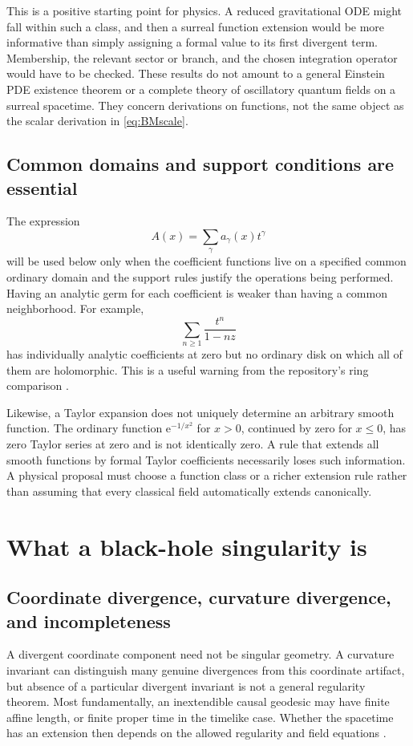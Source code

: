 \documentclass[11pt,a4paper]{article}
\numberwithin{equation}{section}
\theoremstyle{definition}
\theoremstyle{remark}
\newcommand{\ee}{\mathrm e}
\begin{document}
This is a positive starting point for physics. A reduced gravitational ODE
might fall within such a class, and then a surreal function extension would be
more informative than simply assigning a formal value to its first divergent
term. Membership, the relevant sector or branch, and the chosen integration
operator would have to be checked. These results do not amount to a general
Einstein PDE existence theorem or a complete theory of oscillatory quantum
fields on a surreal spacetime. They concern derivations on functions, not the
same object as the scalar derivation in \eqref{eq:BMscale}.

\subsection{Common domains and support conditions are essential}
The expression
\[
A(x)=\sum_\gamma a_\gamma(x)t^\gamma
\]
will be used below only when the coefficient functions live on a specified
common ordinary domain and the support rules justify the operations being
performed. Having an analytic germ for each coefficient is weaker than having a
common neighborhood. For example,
\[
\sum_{n\ge1}\frac{t^n}{1-nz}
\]
has individually analytic coefficients at zero but no ordinary disk on which
all of them are holomorphic. This is a useful warning from the repository's
ring comparison \cite{RepoDocs}.

Likewise, a Taylor expansion does not uniquely determine an arbitrary smooth
function. The ordinary function $\ee^{-1/x^2}$ for $x>0$, continued by zero for
$x\le0$, has zero Taylor series at zero and is not identically zero. A rule that
extends all smooth functions by formal Taylor coefficients necessarily loses
such information. A physical proposal must choose a function class or a richer
extension rule rather than assuming that every classical field automatically
extends canonically.

\section{What a black-hole singularity is}\label{sec:singularity}

\subsection{Coordinate divergence, curvature divergence, and incompleteness}
A divergent coordinate component need not be singular geometry. A curvature
invariant can distinguish many genuine divergences from this coordinate
artifact, but absence of a particular divergent invariant is not a general
regularity theorem. Most fundamentally, an inextendible causal geodesic may
have finite affine length, or finite proper time in the timelike case. Whether
the spacetime has an extension then depends on the allowed regularity and field
equations \cite{Witten,Dafermos,DL}.
\end{document}
